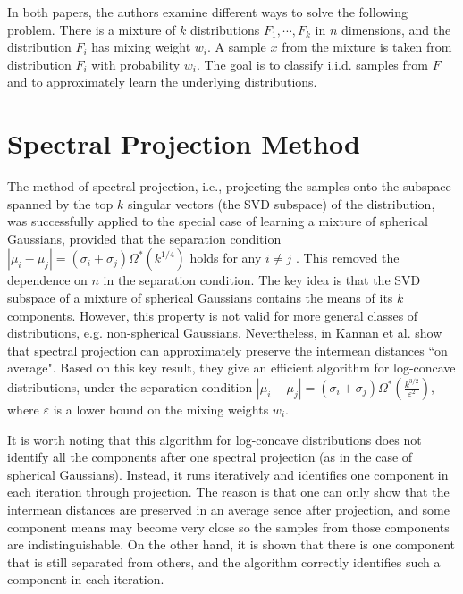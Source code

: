 \documentclass[11pt,letter]{article}
\begin{document}
In both papers, the authors examine different ways to solve the following problem. There is a mixture of $k$ distributions $F_1, \cdots, F_k$ in $n$ dimensions, and the distribution $F_i$ has mixing weight $w_i$. A sample $x$ from the mixture is taken from distribution $F_i$ with probability $w_i$. The goal is to classify i.i.d. samples from $F$ and to approximately learn the underlying distributions.

\section{Spectral Projection Method}


The method of spectral projection, i.e., projecting the samples onto the subspace spanned by the top $k$ singular vectors (the SVD subspace) of the distribution, was successfully applied to the special case of learning a mixture of spherical Gaussians, provided that the separation condition $|\mu_i - \mu_j| = (\sigma_i + \sigma_j) \Omega^*(k^{1/4})$ holds for any $i\not=j$ \cite{Vempala02aspectral}. This removed the dependence on $n$ in the separation condition. The key idea is that the SVD subspace of a mixture of spherical Gaussians contains the means of its $k$ components. However, this property is not valid for more general classes of distributions, e.g. non-spherical Gaussians.
Nevertheless, in \cite{Kannan08spectral} Kannan et al. show that spectral projection can approximately preserve the intermean distances ``on average". Based on this key result, they give an efficient algorithm for log-concave distributions, under the separation condition $|\mu_i - \mu_j| = (\sigma_i + \sigma_j) \Omega^*\left(\frac{k^{3/2}}{\varepsilon^2}\right)$, where $\varepsilon$ is a lower bound on the mixing weights $w_i$.

It is worth noting that this algorithm for log-concave distributions does not identify all the components after one spectral projection (as in the case of spherical Gaussians). Instead, it runs iteratively and identifies one component in each iteration through projection.
The reason is that one can only show that the intermean distances are preserved in an average sence after projection, and some component means may become very close so the samples from those components are indistinguishable. On the other hand, it is shown that there is one component that is still separated from others, and the algorithm correctly identifies such a component in each iteration.\\
\end{document}
